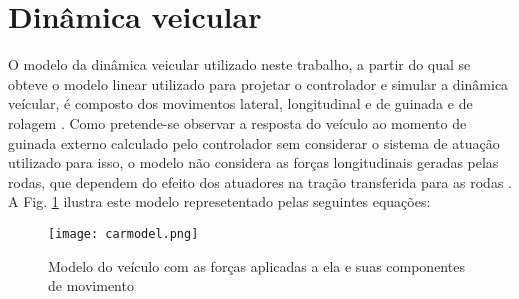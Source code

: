  \section{ Dinâmica veicular }
 \label{sec:model}
 
O modelo da dinâmica veicular utilizado neste trabalho, a partir do qual
se obteve o modelo linear utilizado para projetar o controlador e simular
a dinâmica veícular, é composto dos movimentos lateral, longitudinal e de
guinada e de rolagem \cite{Zheng2006,Miao2015}.
Como pretende-se observar a resposta do veículo ao momento de guinada externo
calculado pelo controlador sem considerar o sistema de atuação utilizado para
isso, o modelo não considera as forças longitudinais geradas pelas rodas, que
dependem do efeito dos atuadores na tração transferida para as rodas
\cite{Shoutao2017}.
A Fig. \ref{fig:modeldraw}  ilustra este modelo represetentado pelas seguintes
equações:

\begin{figure}[t]
    \centering
    \texttt{[image: carmodel.png]}
    \caption{ Modelo do veículo com as forças aplicadas a ela e suas componentes
    de movimento}
    \label{fig:modeldraw}
\end{figure}

